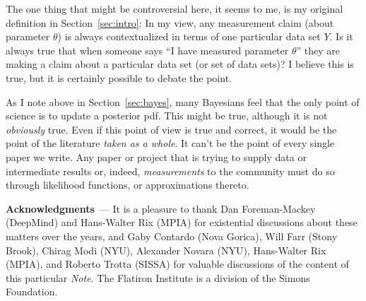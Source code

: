 \documentclass{article}
\renewcommand{\paragraph}[1]{\bigskip\par\noindent\textbf{#1}~---}
\newcommand{\documentname}{\textsl{Note}}
\newcommand{\sectionname}{Section}
\newcommand{\secref}[1]{\sectionname~\ref{#1}}
\begin{document}
The one thing that might be controversial here, it seems to me, is my original definition in \secref{sec:intro}:
In my view, any measurement claim (about parameter $\theta$) is always contextualized in terms of one particular data set $Y$.
Is it always true that when someone says ``I have measured parameter $\theta$'' they are making a claim about a particular data set (or set of data sets)?
I believe this is true, but it is certainly possible to debate the point.

As I note above in \secref{sec:bayes}, many Bayesians feel that the only point of science is to update a posterior pdf.
This might be true, although it is not \emph{obviously} true.
Even if this point of view is true and correct, it would be the point of the literature \emph{taken as a whole}. 
It can't be the point of every single paper we write.
Any paper or project that is trying to supply data or intermediate results or, indeed, \emph{measurements} to the community must do so through likelihood functions, or approximations thereto.

\paragraph{Acknowledgments}
It is a pleasure to thank
  Dan Foreman-Mackey (DeepMind) and
  Hans-Walter Rix (MPIA)
for existential discussions about these matters over the years, and
  Gaby Contardo (Nova Gorica),
  Will Farr (Stony Brook),
  Chirag Modi (NYU),
  Alexander Novara (NYU),
  Hans-Walter Rix (MPIA), and
  Roberto Trotta (SISSA)
for valuable discussions of the content of this particular \documentname.
The Flatiron Institute is a division of the Simons Foundation.

\raggedright\footnotesize


\end{document}

